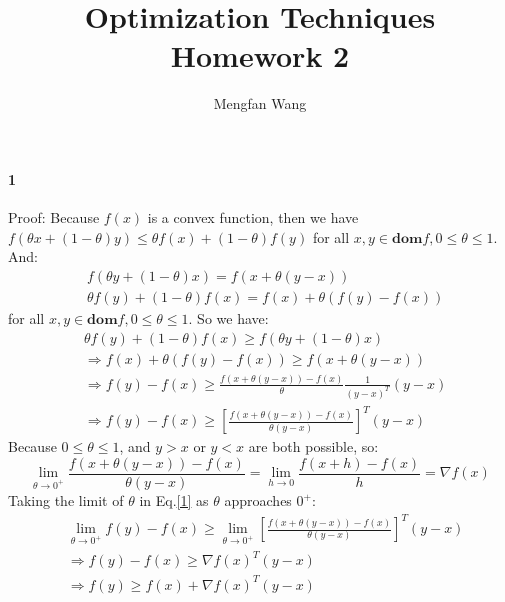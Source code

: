 \documentclass[22pt]{article}
\author{Mengfan Wang}
\title{Optimization Techniques Homework 2}
\begin{document}
	\maketitle 
	\paragraph{1} Proof: Because $f(x)$ is a convex function, then we have $f(\theta x +(1-\theta)y)\leq \theta f(x) + (1-\theta)f(y)$ for all $x,y \in \mathbf{dom}f, 0 \leq \theta \leq 1$. And:
	\begin{align}
		&f(\theta y + (1-\theta)x) = f(x+\theta(y-x))\\
		&\theta f(y) +(1-\theta)f(x) = f(x)+\theta(f(y)-f(x))
	\end{align}
	for all $x,y \in \mathbf{dom}f, 0 \leq \theta \leq 1$. So we have:
	\begin{align}
		&  \theta f(y) +(1-\theta)f(x)\geq f(\theta y + (1-\theta)x)\\
		& \Rightarrow f(x)+\theta(f(y)-f(x))\geq f(x+\theta(y-x))\\
		& \Rightarrow f(y) -f(x) \geq \frac{f(x+\theta (y-x))-f(x)}{\theta }\frac{1}{(y-x)^T}(y-x) \\
		& \Rightarrow f(y) -f(x) \geq [\frac{f(x+\theta (y-x))-f(x)}{\theta (y-x)}]^T(y-x) \label{1}
	\end{align}
	Because $0 \leq \theta \leq 1$, and $y > x$ or $y < x$ are both possible, so:
	\begin{equation}
		\lim_{\theta \to 0^+}\frac{f(x+\theta (y-x))-f(x)}{\theta (y-x)} = \lim_{h \to 0}\frac{f(x+h)-f(x)}{h} = \nabla f(x) 
	\end{equation}
	Taking the limit of $\theta$ in Eq.\ref{1} as $\theta$ approaches $0^+$:
	\begin{align}
		& \lim_{\theta \to 0^+}f(y) -f(x) \geq \lim_{\theta \to 0^+}[\frac{f(x+\theta (y-x))-f(x)}{\theta (y-x)}]^T(y-x)\\
		& \Rightarrow f(y)-f(x)\geq \nabla f(x)^T (y-x)\\
		& \Rightarrow f(y) \geq f(x)+ \nabla f(x)^T (y-x)
	\end{align}
\end{document}
